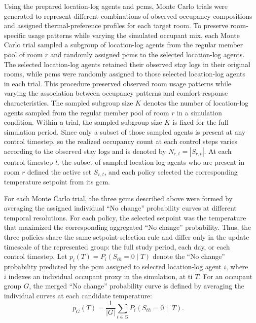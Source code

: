 Using the prepared location-log agents and \acp{pcm}, Monte Carlo trials were generated to represent different combinations of observed occupancy compositions and assigned thermal-preference profiles for each target room.
To preserve room-specific usage patterns while varying the simulated occupant mix, each Monte Carlo trial sampled a subgroup of location-log agents from the regular member pool of room $r$ and randomly assigned \acp{pcm} to the selected location-log agents.
The selected location-log agents retained their observed stay logs in their original rooms, while \acp{pcm} were randomly assigned to those selected location-log agents in each trial.
This procedure preserved observed room usage patterns while varying the association between occupancy patterns and comfort-response characteristics.
The sampled subgroup size $K$ denotes the number of location-log agents sampled from the regular member pool of room $r$ in a simulation condition.
Within a trial, the sampled subgroup size $K$ is fixed for the full simulation period.
Since only a subset of those sampled agents is present at any control timestep, so the realized occupancy count at each control steps varies according to the observed stay logs and is denoted by $N_{r,t}=|S_{r,t}|$.
At each control timestep $t$, the subset of sampled location-log agents who are present in room $r$ defined the active set $S_{r,t}$, and each policy selected the corresponding temperature setpoint from its \ac{gcm}.

For each Monte Carlo trial, the three \acp{gcm} described above were formed by averaging the assigned individual ``No change'' probability curves at different temporal resolutions.
For each policy, the selected setpoint was the temperature that maximized the corresponding aggregated ``No change'' probability.
Thus, the three policies share the same setpoint-selection rule and differ only in the update timescale of the represented group: the full study period, each day, or each control timestep.
Let $p_i(T)=P_i(S_{th}=0\mid T)$ denote the ``No change'' probability predicted by the \ac{pcm} assigned to selected location-log agent $i$, where $i$ indexes an individual occupant proxy in the simulation, at \acl{ti} $T$.
For an occupant group $G$, the merged ``No change'' probability curve is defined by averaging the individual curves at each candidate temperature:
\begin{equation}
\bar{p}_{G}(T)
=
\frac{1}{|G|}\sum_{i\in G}
P_i\!\left(S_{th}=0\,\middle|\,T\right).
\label{eq:gcm_probability_curve}
\end{equation}

